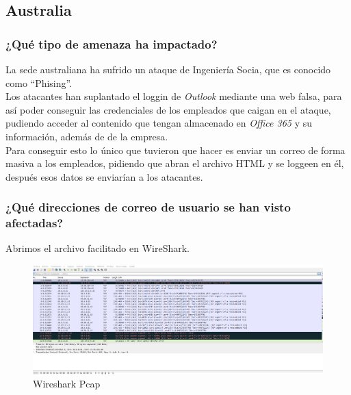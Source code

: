 \documentclass[12pt,twoside]{article}
\begin{document}
\subsection{Australia}
\subsubsection*{¿Qué tipo de amenaza ha impactado?}
La sede australiana ha sufrido un ataque de Ingeniería Socia, que es conocido como “Phising”.\\
Los atacantes han suplantado el loggin de \textit{Outlook} mediante una web falsa, para así poder conseguir las credenciales de los empleados que caigan en el ataque, pudiendo acceder al contenido que tengan almacenado en \textit{Office 365} y su información, además de de la empresa. \\
Para conseguir esto lo único que tuvieron que hacer es enviar un correo de forma masiva a los empleados, pidiendo que abran el archivo HTML y se loggeen en él, después esos datos se enviarían a los atacantes.


\subsubsection*{¿Qué direcciones de correo de usuario se han visto afectadas?}
Abrimos el archivo facilitado en WireShark.
\begin{figure}[h]
    \centering
    \includegraphics[scale=0.3]{./imagenes/wireshark_uno}
    \caption{Wireshark Pcap}
\end{figure}
\end{document}
